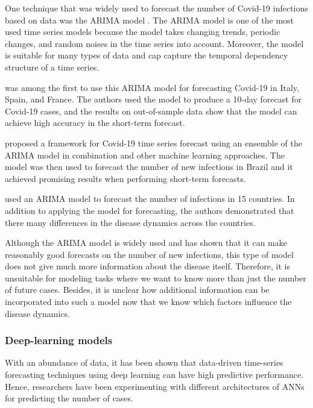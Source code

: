 One technique that was widely used to forecast the number of Covid-19 infections based on data was the \gls{ARIMA} model \cite{box2015time}.
The \gls{ARIMA} model is one of the most used time series models because the model takes changing trends, periodic changes, and random noises in the time series into account.
Moreover, the model is suitable for many types of data and cap capture the temporal dependency structure of a time series.

\citeauthor{ceylanEstimationCOVID19Prevalence2020} \cite{ceylanEstimationCOVID19Prevalence2020} was among the first to use this \gls{ARIMA} model for forecasting Covid-19 in Italy, Spain, and France.
The authors used the model to produce a 10-day forecast for Covid-19 cases, and the results on out-of-sample data show that the model can achieve high accuracy in the short-term forecast.

\citeauthor{ribeiroShorttermForecastingCOVID192020} \cite{ribeiroShorttermForecastingCOVID192020} proposed a framework for Covid-19 time series forecast using an ensemble of the \gls{ARIMA} model in combination and other machine learning approaches.
The model was then used to forecast the number of new infections in Brazil and it achieved promising results when performing short-term forecasts.

\citeauthor{singhPredictionCOVID19Pandemic2020} \cite{singhPredictionCOVID19Pandemic2020} used an \gls{ARIMA} model to forecast the number of infections in 15 countries.
In addition to applying the model for forecasting, the authors demonstrated that there many differences in the disease dynamics across the countries.

Although the \gls{ARIMA} model is widely used and has shown that it can make reasonably good forecasts on the number of new infections, this type of model does not give much more information about the disease itself.
Therefore, it is unsuitable for modeling tasks where we want to know more than just the number of future cases.
Besides, it is unclear how additional information can be incorporated into such a model now that we know which factors influence the disease dynamics.

\subsubsection{Deep-learning models}

With an abundance of data, it has been shown that data-driven time-series forecasting techniques using deep learning can have high predictive performance.
Hence, researchers have been experimenting with different architectures of \glspl{ANN} for predicting the number of cases.

